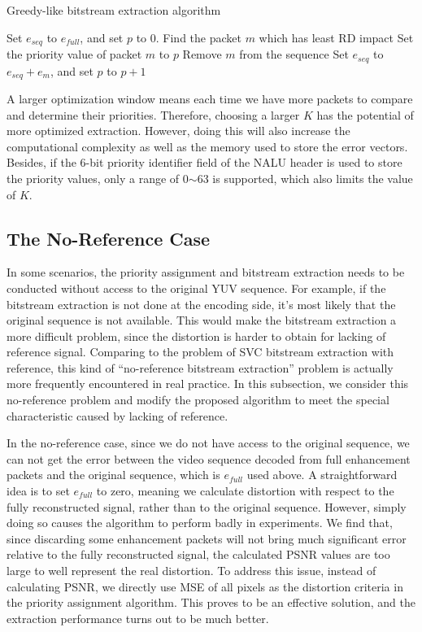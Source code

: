 \documentclass[journal]{IEEEtran}
\begin{document}
\begin{algorithm}
\caption{Greedy-like bitstream extraction algorithm}
\label{algo:greedy}
\begin{algorithmic}
    \STATE Set $e_{seq}$ to $e_{full}$, and set $p$ to 0.
		    \STATE Find the packet $m$ which has least RD impact
		\ENDFOR
		\STATE Set the priority value of packet $m$ to $p$
		\STATE Remove $m$ from the sequence
		\STATE Set $e_{seq}$ to $e_{seq} + e_m$, and set $p$ to $p+1$
    \ENDWHILE
\end{algorithmic}
\end{algorithm}

A larger optimization window means each time we have more packets to compare and determine their priorities. Therefore, choosing a larger $K$ has the potential of more optimized extraction. However, doing this will also increase the computational complexity as well as the memory used to store the error vectors. Besides, if the 6-bit priority identifier field of the NALU header is used to store the priority values, only a range of 0$\sim$63 is supported, which also limits the value of $K$.

\subsection{The No-Reference Case}
\label{subsec:noref}

In some scenarios, the priority assignment and bitstream extraction needs to be conducted without access to the original YUV sequence. For example, if the bitstream extraction is not done at the encoding side, it's most likely that the original sequence is not available. This would make the bitstream extraction a more difficult problem, since the distortion is harder to obtain for lacking of reference signal. Comparing to the problem of SVC bitstream extraction with reference, this kind of ``no-reference bitstream extraction'' problem is actually more frequently encountered in real practice. In this subsection, we consider this no-reference problem and modify the proposed algorithm to meet the special characteristic caused by lacking of reference.

In the no-reference case, since we do not have access to the original sequence, we can not get the error between the video sequence decoded from full enhancement packets and the original sequence, which is $e_{full}$ used above. A straightforward idea is to set $e_{full}$ to zero, meaning we calculate distortion with respect to the fully reconstructed signal, rather than to the original sequence. However, simply doing so causes the algorithm to perform badly in experiments. We find that, since discarding some enhancement packets will not bring much significant error relative to the fully reconstructed signal, the calculated PSNR values are too large to well represent the real distortion. To address this issue, instead of calculating PSNR, we directly use MSE of all pixels as the distortion criteria in the priority assignment algorithm. This proves to be an effective solution, and the extraction performance turns out to be much better.
\end{document}
